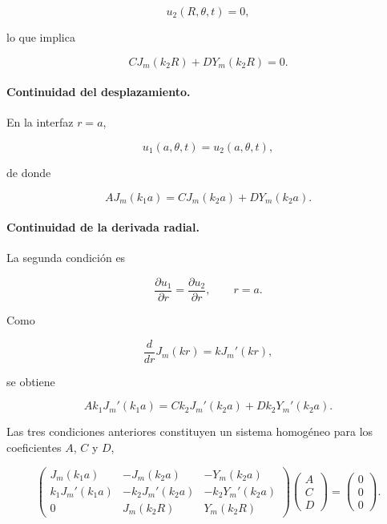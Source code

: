 \documentclass[12pt]{article}
\begin{document}
\[
u_2(R,\theta,t)=0,
\]

lo que implica

\begin{equation}
\boxed{
CJ_m(k_2R)
+
DY_m(k_2R)
=0.
}
\end{equation}

\paragraph{Continuidad del desplazamiento.}

En la interfaz $r=a$,

\[
u_1(a,\theta,t)=u_2(a,\theta,t),
\]

de donde

\begin{equation}
\boxed{
AJ_m(k_1a)
=
CJ_m(k_2a)
+
DY_m(k_2a).
}
\end{equation}

\paragraph{Continuidad de la derivada radial.}

La segunda condición es

\[
\frac{\partial u_1}{\partial r}
=
\frac{\partial u_2}{\partial r},
\qquad
r=a.
\]

Como

\[
\frac{d}{dr}
J_m(kr)
=
kJ_m'(kr),
\]

se obtiene

\begin{equation}
\boxed{
Ak_1J_m'(k_1a)
=
Ck_2J_m'(k_2a)
+
Dk_2Y_m'(k_2a).
}
\end{equation}

Las tres condiciones anteriores constituyen un sistema homogéneo para los coeficientes $A$, $C$ y $D$,

\begin{equation}
\begin{pmatrix}
J_m(k_1a)
&
-J_m(k_2a)
&
-Y_m(k_2a)
\\[2mm]
k_1J_m'(k_1a)
&
-k_2J_m'(k_2a)
&
-k_2Y_m'(k_2a)
\\[2mm]
0
&
J_m(k_2R)
&
Y_m(k_2R)
\end{pmatrix}
\begin{pmatrix}
A\\
C\\
D
\end{pmatrix}
=
\begin{pmatrix}
0\\
0\\
0
\end{pmatrix}.
\end{equation}
\end{document}
